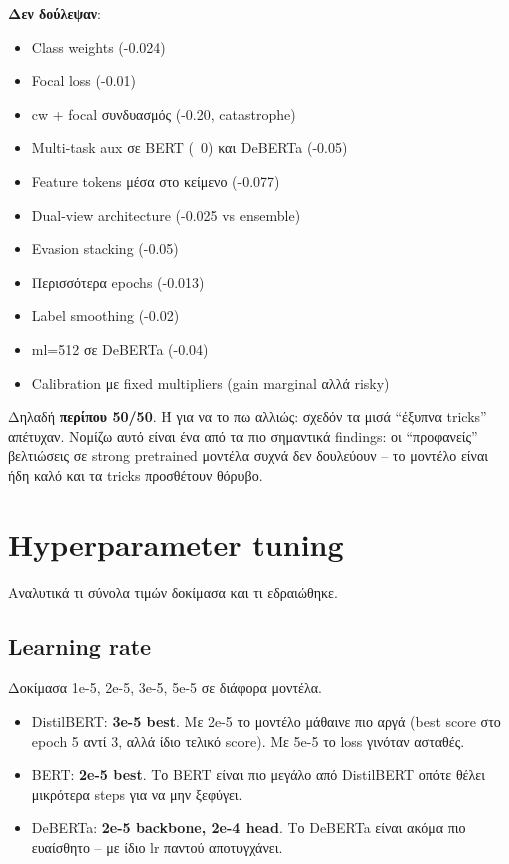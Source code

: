\documentclass[12pt]{fphw}
\begin{document}
\textbf{Δεν δούλεψαν}:
\begin{itemize}
    \item Class weights (-0.024)
    \item Focal loss (-0.01)
    \item cw + focal συνδυασμός (-0.20, catastrophe)
    \item Multi-task aux σε BERT (~0) και DeBERTa (-0.05)
    \item Feature tokens μέσα στο κείμενο (-0.077)
    \item Dual-view architecture (-0.025 vs ensemble)
    \item Evasion stacking (-0.05)
    \item Περισσότερα epochs (-0.013)
    \item Label smoothing (-0.02)
    \item ml=512 σε DeBERTa (-0.04)
    \item Calibration με fixed multipliers (gain marginal αλλά risky)
\end{itemize}

Δηλαδή \textbf{περίπου 50/50}. Ή για να το πω αλλιώς: σχεδόν τα μισά ``έξυπνα tricks'' απέτυχαν. Νομίζω αυτό είναι ένα από τα πιο σημαντικά findings: οι ``προφανείς'' βελτιώσεις σε strong pretrained μοντέλα συχνά δεν δουλεύουν -- το μοντέλο είναι ήδη καλό και τα tricks προσθέτουν θόρυβο.

\section{Hyperparameter tuning}

Αναλυτικά τι σύνολα τιμών δοκίμασα και τι εδραιώθηκε.

\subsection{Learning rate}

Δοκίμασα 1e-5, 2e-5, 3e-5, 5e-5 σε διάφορα μοντέλα.

\begin{itemize}
    \item DistilBERT: \textbf{3e-5 best}. Με 2e-5 το μοντέλο μάθαινε πιο αργά (best score στο epoch 5 αντί 3, αλλά ίδιο τελικό score). Με 5e-5 το loss γινόταν ασταθές.
    \item BERT: \textbf{2e-5 best}. Το BERT είναι πιο μεγάλο από DistilBERT οπότε θέλει μικρότερα steps για να μην ξεφύγει.
    \item DeBERTa: \textbf{2e-5 backbone, 2e-4 head}. Το DeBERTa είναι ακόμα πιο ευαίσθητο -- με ίδιο lr παντού αποτυγχάνει.
\end{itemize}
\end{document}
